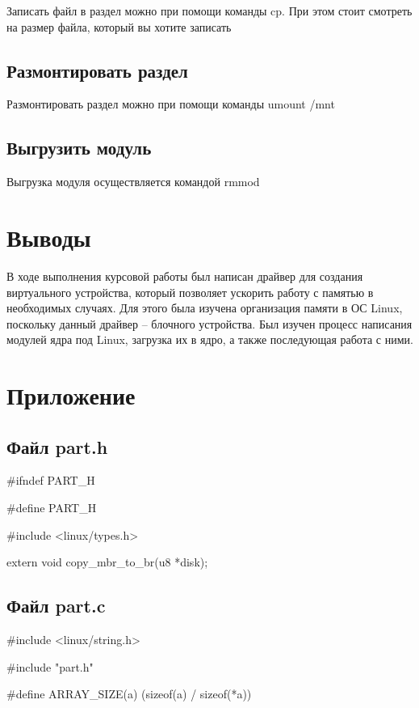 \documentclass[11pt]{article}
\begin{document}
Записать файл в раздел можно при помощи команды cp. При этом стоит смотреть на размер файла, который вы хотите записать

\subsection{Размонтировать раздел}

Размонтировать раздел можно при помощи команды umount /mnt

\subsection{Выгрузить модуль}

Выгрузка модуля осуществляется командой rmmod

\newpage

\section{Выводы}

В ходе выполнения курсовой работы был написан драйвер для создания виртуального устройства, который позволяет ускорить работу с памятью в необходимых случаях. Для этого была изучена организация памяти в ОС Linux, поскольку данный драйвер – блочного устройства. Был изучен процесс написания модулей ядра под Linux, загрузка их в ядро, а также последующая работа с ними.

\newpage

\section{Приложение}
\subsection{Файл part.h}

\#ifndef PART\_H

\#define PART\_H

\#include <linux/types.h>

extern void copy\_mbr\_to\_br(u8 *disk);

\endif
\subsection{Файл part.c}

\#include <linux/string.h>

\#include "part.h"

\#define ARRAY\_SIZE(a) (sizeof(a) / sizeof(*a))
\end{document}
